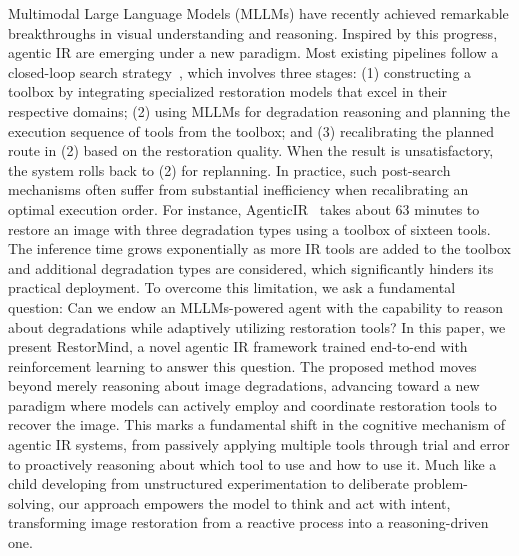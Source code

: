 Multimodal Large Language Models (MLLMs) have recently achieved remarkable breakthroughs in visual understanding and reasoning. Inspired by this progress, agentic IR are emerging under a new paradigm. Most existing pipelines follow a closed-loop search strategy~\cite{wu2025vtool}, which involves three stages:
(1) constructing a toolbox by integrating specialized restoration models that excel in their respective domains;
(2) using MLLMs for degradation reasoning and planning the execution sequence of tools from the toolbox; and
(3) recalibrating the planned route in (2) based on the restoration quality.
When the result is unsatisfactory, the system rolls back to (2) for replanning. In practice, such post-search mechanisms often suffer from substantial inefficiency when recalibrating an optimal execution order.
For instance, AgenticIR~\cite{zhu2024intelligent} takes about 63 minutes to restore an image with three degradation types using a toolbox of sixteen tools. The inference time grows exponentially as more IR tools are added to the toolbox and additional degradation types are considered, which significantly hinders its practical deployment. To overcome this limitation, we ask a fundamental question: Can we endow an MLLMs-powered agent with the capability to reason about degradations while adaptively utilizing restoration tools? In this paper, we present RestorMind, a novel agentic IR framework trained end-to-end with reinforcement learning to answer this question. The proposed method moves beyond merely reasoning about image degradations, advancing toward a new paradigm where models can actively employ and coordinate restoration tools to recover the image. This marks a fundamental shift in the cognitive mechanism of agentic IR systems, from passively applying multiple tools through trial and error to proactively reasoning about which tool to use and how to use it. Much like a child developing from unstructured experimentation to deliberate problem-solving, our approach empowers the model to think and act with intent, transforming image restoration from a reactive process into a reasoning-driven one.


